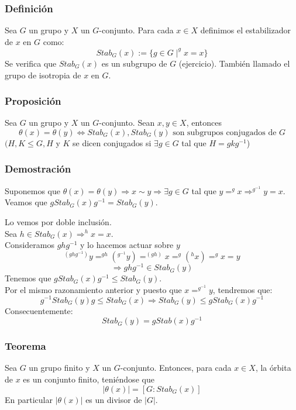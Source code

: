 \documentclass[11pt,a4paper]{article}
\begin{document}
\subsubsection*{Definición}

Sea $G$ un grupo y $X$ un $G$-conjunto. Para cada $x \in X$ definimos el estabilizador de $x$ en $G$ como:
$$Stab_{G}(x) := \{g \in G \mid ^{g}x = x\}$$
Se verifica que $Stab_{G}(x)$ es un subgrupo de $G$ (ejercicio). También llamado el grupo de isotropia de $x$ en $G$.

\subsubsection*{Proposición}

Sea $G$ un grupo y $X$ un $G$-conjunto. Sean $x, y \in X$, entonces
$$\theta(x) = \theta(y) \iff Stab_{G}(x), Stab_{G}(y) \text{ son subgrupos conjugados de } G$$
$(H, K \leqslant G, H$ y $K$ se dicen conjugados si $\exists g \in G$ tal que $H = gkg^{-1}$)

\subsubsection*{Demostración}

Suponemos que $\theta(x) = \theta(y) \Rightarrow x \sim y \Rightarrow \exists g \in G$ tal que $y = ^{g}x \Rightarrow ^{g^{-1}}y= x$. \\
Veamos que $g Stab_{G}(x) g^{-1} = Stab_{G}(y)$.

Lo vemos por doble inclusión. \\
Sea $h \in Stab_{G}(x) \Rightarrow ^{h}x = x$. \\
Consideramos $ghg^{-1}$ y lo hacemos actuar sobre $y$
$$^{(ghg^{-1})}y = ^{gh}(^{g^{-1}}y) = ^{(gh)}x = ^{g}(^{h}x) = ^{g}x = y$$
$$\Rightarrow ghg^{-1} \in Stab_{G}(y)$$
Tenemos que $gStab_{G}(x)g^{-1} \leqslant Stab_{G}(y)$. \\
Por el mismo razonamiento anterior y puesto que $x = ^{g^{-1}}y$, tendremos que:
$$g^{-1} Stab_{G}(y)g \leqslant Stab_{G}(x) \Rightarrow Stab_{G}(y) \leqslant gStab_{G}(x) g^{-1}$$
Consecuentemente:
$$Stab_{G}(y) = g Stab(x) g^{-1}$$

\subsubsection*{Teorema}

Sea $G$ un grupo finito y $X$ un $G$-conjunto. Entonces, para cada $x \in X$, la órbita de $x$ es un conjunto finito, teniéndose que
$$|\theta(x)| = [G:Stab_{G}(x)]$$
En particular $|\theta(x)|$ es un divisor de $|G|$.
\end{document}
